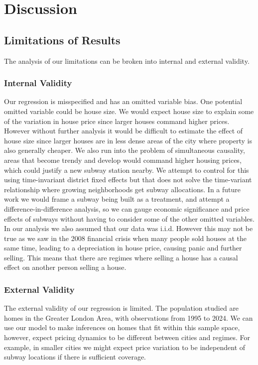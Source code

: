 \section{Discussion}
\label{sec:conclusion}
\subsection{Limitations of Results}
The analysis of our limitations can be broken into internal and external validity.

\subsubsection{Internal Validity}
 Our regression is misspecified and has an omitted variable bias.
  One potential omitted variable could be house size.
   We would expect house size to explain some of the variation in house price since larger houses command higher prices.
    However without further analysis it would be difficult to estimate the effect of house size since larger houses are in less dense areas of the city where property is also generally cheaper.
     We also run into the problem of simultaneous causality, areas that become trendy and develop would command higher housing prices, 
     which could justify a new subway station nearby. We attempt to control for this using time-invariant district fixed effects 
     but that does not solve the time-variant relationship where growing neighborhoods get subway allocations.
      In a future work we would frame a subway being built as a treatment, and attempt a difference-in-difference analysis, 
      so we can gauge economic significance and price effects of subways without having to consider some of the other omitted variables.
In our analysis we also assumed that our data was i.i.d. However this may not be true as we 
saw in the 2008 financial crisis when many people sold houses at the same time, leading to a depreciation in 
house price, causing panic and further selling. This means that there are regimes where selling a house has a causal effect on another person selling a house.

\subsubsection{External Validity}
The external validity of our regression is limited. The population studied are homes in the Greater London Area, 
with observations from 1995 to 2024. We can use our model to make inferences on homes that fit within this sample space, 
however, expect pricing dynamics to be different between cities and regimes. For example, in smaller cities we might expect 
price variation to be independent of subway locations if there is sufficient coverage.


